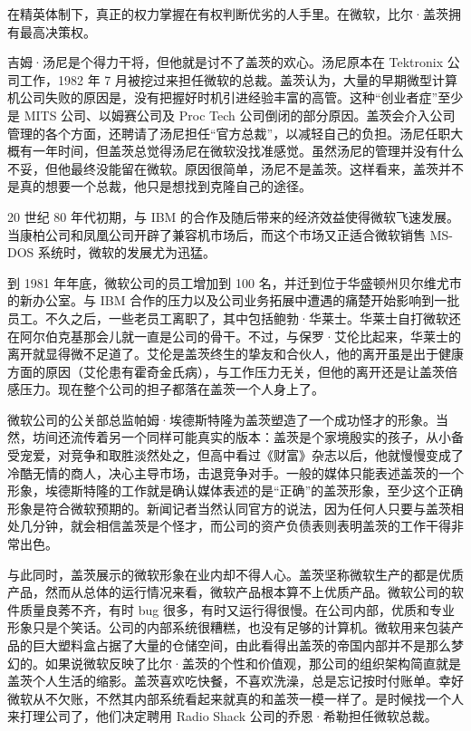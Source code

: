 \documentclass[12pt,UTF8]{ctexbook}
\begin{document}
在精英体制下，真正的权力掌握在有权判断优劣的人手里。在微软，比尔·盖茨拥有最高决策权。

吉姆·汤尼是个得力干将，但他就是讨不了盖茨的欢心。汤尼原本在 Tektronix 公司工作，1982 年 7 月被挖过来担任微软的总裁。盖茨认为，大量的早期微型计算机公司失败的原因是，没有把握好时机引进经验丰富的高管。这种“创业者症”至少是 MITS 公司、以姆赛公司及 Proc Tech 公司倒闭的部分原因。盖茨会介入公司管理的各个方面，还聘请了汤尼担任“官方总裁”，以减轻自己的负担。汤尼任职大概有一年时间，但盖茨总觉得汤尼在微软没找准感觉。虽然汤尼的管理并没有什么不妥，但他最终没能留在微软。原因很简单，汤尼不是盖茨。这样看来，盖茨并不是真的想要一个总裁，他只是想找到克隆自己的途径。

20 世纪 80 年代初期，与 IBM 的合作及随后带来的经济效益使得微软飞速发展。当康柏公司和凤凰公司开辟了兼容机市场后，而这个市场又正适合微软销售 MS-DOS 系统时，微软的发展尤为迅猛。

到 1981 年年底，微软公司的员工增加到 100 名，并迁到位于华盛顿州贝尔维尤市的新办公室。与 IBM 合作的压力以及公司业务拓展中遭遇的痛楚开始影响到一批员工。不久之后，一些老员工离职了，其中包括鲍勃·华莱士。华莱士自打微软还在阿尔伯克基那会儿就一直是公司的骨干。不过，与保罗·艾伦比起来，华莱士的离开就显得微不足道了。艾伦是盖茨终生的挚友和合伙人，他的离开虽是出于健康方面的原因（艾伦患有霍奇金氏病），与工作压力无关，但他的离开还是让盖茨倍感压力。现在整个公司的担子都落在盖茨一个人身上了。

微软公司的公关部总监帕姆·埃德斯特隆为盖茨塑造了一个成功怪才的形象。当然，坊间还流传着另一个同样可能真实的版本：盖茨是个家境殷实的孩子，从小备受宠爱，对竞争和取胜淡然处之，但高中看过《财富》杂志以后，他就慢慢变成了冷酷无情的商人，决心主导市场，击退竞争对手。一般的媒体只能表述盖茨的一个形象，埃德斯特隆的工作就是确认媒体表述的是“正确”的盖茨形象，至少这个正确形象是符合微软预期的。新闻记者当然认同官方的说法，因为任何人只要与盖茨相处几分钟，就会相信盖茨是个怪才，而公司的资产负债表则表明盖茨的工作干得非常出色。

与此同时，盖茨展示的微软形象在业内却不得人心。盖茨坚称微软生产的都是优质产品，然而从总体的运行情况来看，微软产品根本算不上优质产品。微软公司的软件质量良莠不齐，有时 bug 很多，有时又运行得很慢。在公司内部，优质和专业形象只是个笑话。公司的内部系统很糟糕，也没有足够的计算机。微软用来包装产品的巨大塑料盒占据了大量的仓储空间，由此看得出盖茨的帝国内部并不是那么梦幻的。如果说微软反映了比尔·盖茨的个性和价值观，那公司的组织架构简直就是盖茨个人生活的缩影。盖茨喜欢吃快餐，不喜欢洗澡，总是忘记按时付账单。幸好微软从不欠账，不然其内部系统看起来就真的和盖茨一模一样了。是时候找一个人来打理公司了，他们决定聘用 Radio Shack 公司的乔恩·希勒担任微软总裁。
\end{document}
